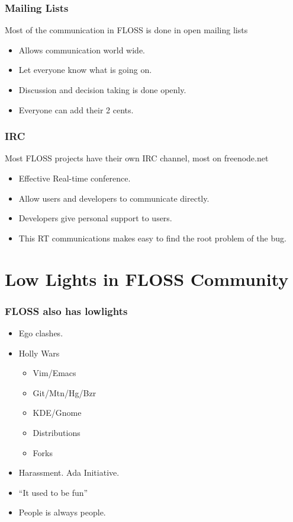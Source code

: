 \documentclass[hyperref={pdfpagelabels=false},xcolor=pst,pdf,fragile]{beamer}
\begin{document}
\begin{frame}
  \frametitle{Mailing Lists}

  Most of the communication in FLOSS is done in open mailing lists

  \begin{itemize}
	  \item Allows communication world wide.
	  \item Let everyone know what is going on.
	  \item Discussion and decision taking is done openly.
	  \item Everyone can add their 2 cents.
  \end{itemize}

\end{frame}

\begin{frame}
  \frametitle{IRC}

  Most FLOSS projects have their own IRC channel, most on freenode.net
  \begin{itemize}
	\item Effective Real-time conference.
	\item Allow users and developers to communicate directly.
	\item Developers give personal support to users.
	\item This RT communications makes easy to find the root problem of the
		bug.
  \end{itemize}

\end{frame}

\section{Low Lights in FLOSS Community}

\begin{frame}
  \frametitle{FLOSS also has lowlights}

  \begin{itemize}
	\item Ego clashes.
	\item Holly Wars
		\begin{itemize}
			\item Vim/Emacs
			\item Git/\alert{Mtn}/Hg/Bzr
			\item KDE/Gnome
			\item Distributions
			\item Forks
		\end{itemize}
	\item Harassment. Ada Initiative.
	\item ``It used to be fun''
	\item People is always people.
  \end{itemize}

\end{frame}
\end{document}
